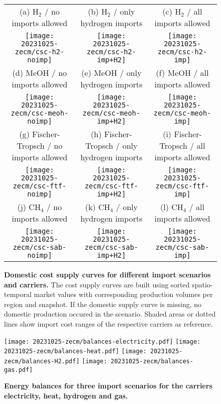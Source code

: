 \begin{figure*}
    \footnotesize
    \begin{tabular}{ccc}
        (a) H$_2$ / no imports allowed & (b) H$_2$ / only hydrogen imports & (c) H$_2$ / all imports allowed \\
        \texttt{[image: 20231025-zecm/csc-h2-noimp]} &
        \texttt{[image: 20231025-zecm/csc-h2-imp+H2]} &
        \texttt{[image: 20231025-zecm/csc-h2-imp]} \\
        (d) MeOH / no imports allowed & (e) MeOH / only hydrogen imports & (f) MeOH / all imports allowed \\
        \texttt{[image: 20231025-zecm/csc-meoh-noimp]} &
        \texttt{[image: 20231025-zecm/csc-meoh-imp+H2]} &
        \texttt{[image: 20231025-zecm/csc-meoh-imp]} \\
        (g) Fischer-Tropsch / no imports allowed & (h) Fischer-Tropsch / only hydrogen imports & (i) Fischer-Tropsch / all imports allowed \\
        \texttt{[image: 20231025-zecm/csc-ftf-noimp]} &
        \texttt{[image: 20231025-zecm/csc-ftf-imp+H2]} &
        \texttt{[image: 20231025-zecm/csc-ftf-imp]} \\
        (j) CH$_4$ / no imports allowed & (k) CH$_4$ / only hydrogen imports & (l) CH$_4$ / all imports allowed \\
        \texttt{[image: 20231025-zecm/csc-sab-noimp]} &
        \texttt{[image: 20231025-zecm/csc-sab-imp+H2]} &
        \texttt{[image: 20231025-zecm/csc-sab-imp]} \\
    \end{tabular}
    \caption{\textbf{Domestic cost supply curves for different import scenarios and carriers.}
        The cost supply curves are built using sorted spatio-temporal market
        values with corresponding production volumes per region and snapshot. If
        the domestic supply curve is missing, no domestic production occured in
        the scenario. Shaded areas or dotted lines show import cost ranges of
        the respective carriers as reference.}
    \label{fig:si:cost-supply-curves}
\end{figure*}


\begin{figure*}
    \texttt{[image: 20231025-zecm/balances-electricity.pdf]}
    \texttt{[image: 20231025-zecm/balances-heat.pdf]}
    \texttt{[image: 20231025-zecm/balances-H2.pdf]}
    \texttt{[image: 20231025-zecm/balances-gas.pdf]}
    \caption{\textbf{Energy balances for three import scenarios for the carriers electricity, heat, hydrogen and gas.}
    }
    \label{fig:si:balances-a}
\end{figure*}


